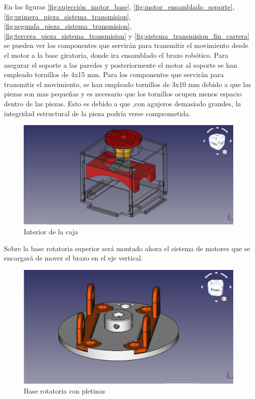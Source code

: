 En las figuras \ref{fig:sujección_motor_base}, \ref{fig:motor_ensamblado_soporte}, \ref{fig:primera_pieza_sistema_transmision},
\ref{fig:segunda_pieza_sistema_transmision},
\ref{fig:tercera_pieza_sistema_transmision} y \ref{fig:sistema_transmision_fin_carrera} se pueden ver los componentes que servirán para transmitir el movimiento desde el motor a la base giratoria, donde ira ensamblado el brazo robótico. Para asegurar el soporte a las paredes y posteriormente el motor al soporte se han empleado tornillos de 4x15 mm. Para los componentes que servirán para transmitir el movimiento, se han empleado tornillos de 3x10 mm debido a que las piezas son mas pequeñas y es necesario que los tornillos ocupen menos espacio dentro de las piezas. Esto es debido a que ,con agujeros demasiado grandes, la integridad estructural de la pieza podría verse comprometida.

\begin{figure}[H]
    \centering 
    \includegraphics[width=1\linewidth]{pictures/CajaConPiezasInternas.png}
    \caption{Interior de la caja}
    \label{fig:interior_caja_sujeccion}
\end{figure}

Sobre la base rotatoria superior será montado ahora el sistema de motores que se encargará de mover el brazo en el eje vertical.

\begin{figure}[H]
    \centering 
    \includegraphics[width=1\linewidth]{pictures/BaseRotatoriaConPletinas.png}
    \caption{Base rotatoria con pletinas}
    \label{fig:base_rotatoria_pletinas}
\end{figure}

